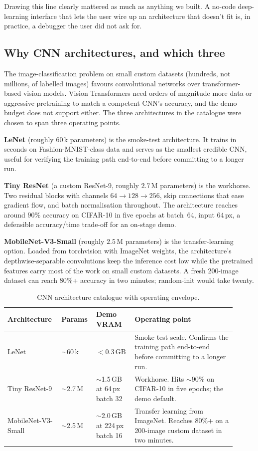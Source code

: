 \documentclass[12pt, a4paper, oneside]{report}
\begin{document}
Drawing this line clearly mattered as much as anything we built. A
no-code deep-learning interface that lets the user wire up an
architecture that doesn't fit is, in practice, a debugger the user
did not ask for.

\subsection{Why CNN architectures, and which three}

The image-classification problem on small custom datasets
(hundreds, not millions, of labelled images) favours convolutional
networks over transformer-based vision models. Vision Transformers
need orders of magnitude more data or aggressive pretraining to
match a competent CNN's accuracy, and the demo budget does not
support either. The three architectures in the catalogue were chosen
to span three operating points.

\textbf{LeNet} (roughly $60$\,k parameters) is the smoke-test
architecture. It trains in seconds on Fashion-MNIST-class data and
serves as the smallest credible CNN, useful for verifying the
training path end-to-end before committing to a longer run.

\textbf{Tiny ResNet} (a custom ResNet-9, roughly $2.7$\,M parameters)
is the workhorse. Two residual blocks with channels
$64 \to 128 \to 256$, skip connections that ease gradient flow, and
batch normalisation throughout. The architecture reaches around
$90\%$ accuracy on CIFAR-10 in five epochs at batch~64, input
$64$\,px, a defensible accuracy/time trade-off for an on-stage
demo.

\textbf{MobileNet-V3-Small} (roughly $2.5$\,M parameters) is the
transfer-learning option. Loaded from torchvision with ImageNet
weights, the architecture's depthwise-separable convolutions keep
the inference cost low while the pretrained features carry most of
the work on small custom datasets. A fresh 200-image dataset can
reach $80\%$+ accuracy in two minutes; random-init would take
twenty.

\begin{table}[H]
\centering
\caption{CNN architecture catalogue with operating envelope.}
\label{tab:cnn_catalog}
\begin{tabular}{|L{0.21\linewidth}|L{0.12\linewidth}|L{0.16\linewidth}|L{0.42\linewidth}|}
\hline
\textbf{Architecture} & \textbf{Params} & \textbf{Demo VRAM} & \textbf{Operating point} \\
\hline
LeNet & $\sim$60\,k & $<$0.3\,GB & Smoke-test scale. Confirms the training path end-to-end before committing to a longer run. \\ \hline
Tiny ResNet-9 & $\sim$2.7\,M & $\sim$1.5\,GB at 64\,px batch 32 & Workhorse. Hits $\sim$90\% on CIFAR-10 in five epochs; the demo default. \\ \hline
MobileNet-V3-Small & $\sim$2.5\,M & $\sim$2.0\,GB at 224\,px batch 16 & Transfer learning from ImageNet. Reaches $80\%$+ on a 200-image custom dataset in two minutes. \\
\hline
\end{tabular}
\end{table}
\end{document}
